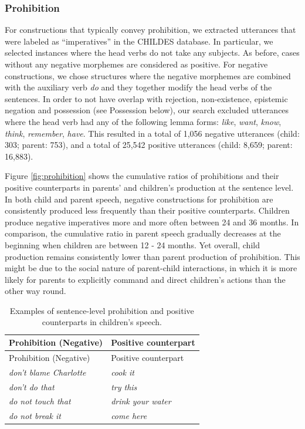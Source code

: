 \documentclass[
  english,
  man,floatsintext]{apa6}
\begin{document}
\hypertarget{prohibition}{%
\subsubsection{Prohibition}\label{prohibition}}

For constructions that typically convey prohibition, we extracted utterances that were labeled as ``imperatives'' in the CHILDES database. In particular, we selected instances where the head verbs do not take any subjects. As before, cases without any negative morphemes are considered as positive. For negative constructions, we chose structures where the negative morphemes are combined with the auxiliary verb \emph{do} and they together modify the head verbs of the sentences. In order to not have overlap with rejection, non-existence, epistemic negation and possession (see Possession below), our search excluded utterances where the head verb had any of the following lemma forms: \emph{like}, \emph{want}, \emph{know}, \emph{think}, \emph{remember}, \emph{have}. This resulted in a total of 1,056 negative utterances (child: 303; parent: 753), and a total of 25,542 positive utterances (child: 8,659; parent: 16,883).

Figure \ref{fig:prohibition} shows the cumulative ratios of prohibitions and their positive counterparts in parents' and children's production at the sentence level. In both child and parent speech, negative constructions for prohibition are consistently produced less frequently than their positive counterparts. Children produce negative imperatives more and more often between 24 and 36 months. In comparison, the cumulative ratio in parent speech gradually decreases at the beginning when children are between 12 - 24 months. Yet overall, child production remains consistently lower than parent production of prohibition. This might be due to the social nature of parent-child interactions, in which it is more likely for parents to explicitly command and direct children's actions than the other way round.

\begin{longtable}[]{@{}ll@{}}
\caption{\label{tab:prohibit} Examples of sentence-level prohibition and positive counterparts in children's speech.}\tabularnewline
\toprule
Prohibition (Negative) & Positive counterpart \\
\midrule
\endfirsthead
\toprule
Prohibition (Negative) & Positive counterpart \\
\midrule
\endhead
\emph{don't blame Charlotte} & \emph{cook it} \\
\emph{don't do that} & \emph{try this} \\
\emph{do not touch that} & \emph{drink your water} \\
\emph{do not break it} & \emph{come here} \\
\bottomrule
\end{longtable}
\end{document}
